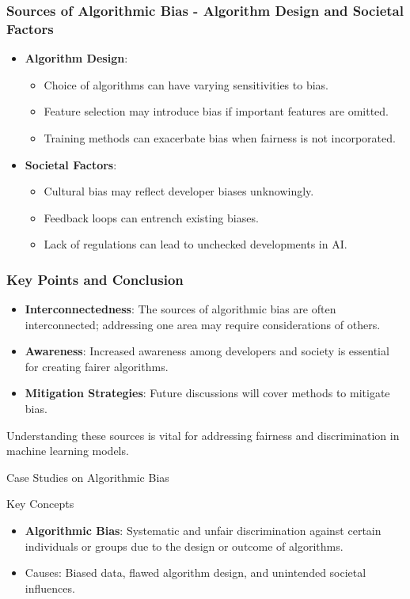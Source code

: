 \documentclass[aspectratio=169]{beamer}
\begin{document}
\begin{frame}[fragile]
    \frametitle{Sources of Algorithmic Bias - Algorithm Design and Societal Factors}
    \begin{itemize}
        \item \textbf{Algorithm Design}:
            \begin{itemize}
                \item Choice of algorithms can have varying sensitivities to bias.
                \item Feature selection may introduce bias if important features are omitted.
                \item Training methods can exacerbate bias when fairness is not incorporated.
            \end{itemize}
        \item \textbf{Societal Factors}:
            \begin{itemize}
                \item Cultural bias may reflect developer biases unknowingly.
                \item Feedback loops can entrench existing biases.
                \item Lack of regulations can lead to unchecked developments in AI.
            \end{itemize}
    \end{itemize}
\end{frame}

\begin{frame}[fragile]
    \frametitle{Key Points and Conclusion}
    \begin{itemize}
        \item \textbf{Interconnectedness}:
            The sources of algorithmic bias are often interconnected; addressing one area may require considerations of others.
        \item \textbf{Awareness}:
            Increased awareness among developers and society is essential for creating fairer algorithms.
        \item \textbf{Mitigation Strategies}:
            Future discussions will cover methods to mitigate bias.
    \end{itemize}
    Understanding these sources is vital for addressing fairness and discrimination in machine learning models.
\end{frame}

\begin{frame}[fragile]{Case Studies on Algorithmic Bias}
    \begin{block}{Key Concepts}
        \begin{itemize}
            \item \textbf{Algorithmic Bias}: Systematic and unfair discrimination against certain individuals or groups due to the design or outcome of algorithms. 
            \item Causes: Biased data, flawed algorithm design, and unintended societal influences.
        \end{itemize}
    \end{block}
\end{frame}
\end{document}
